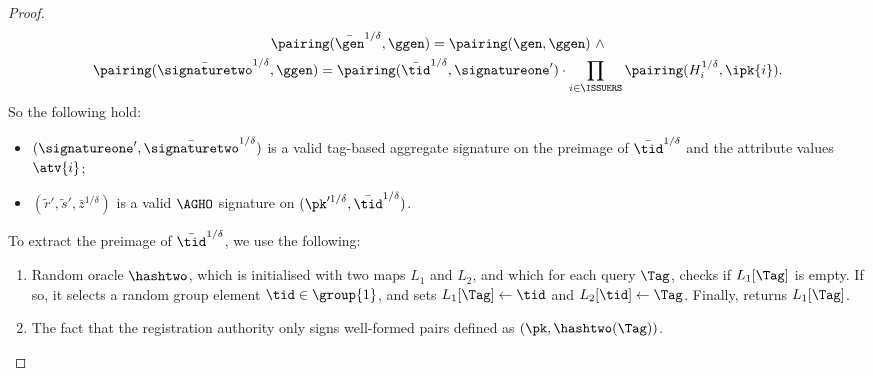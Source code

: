 \begin{proof}
\begin{gather*}
\pairing(\bar{\gen}^{1/\delta}, \ggen)= \pairing(\gen, \ggen) \ \wedge \\
    \pairing(\bar{\signaturetwo}^{1/\delta}, \ggen) =
\pairing(\bar{\tid}^{1/\delta},
\signatureone')\cdot\prod_{i\in\ISSUERS}\pairing(H_i^{1/\delta}, \ipk{i}).
  \end{gather*}
%
  So the following hold:
  \begin{itemize}
    \item $(\signatureone', \bar{\signaturetwo}^{1/\delta})$ is a valid
tag-based aggregate signature on the preimage of $\bar{\tid}^{1/\delta}$ and
the attribute values $\atv{i}$;
    \item $(\widetilde{r}', \widetilde{s}', \bar{z}^{1/\delta})$ is a valid
$\AGHO$ signature on $(\pk'^{1/\delta}, \bar{\tid}^{1/\delta})$.
  \end{itemize}

  To extract the preimage of $\bar{\tid}^{1/\delta}$, we use the following:

  \begin{enumerate}

    \item Random oracle $\hashtwo$, which is initialised with two maps $L_1$ and
$L_2$, and which for each query $\Tag$, checks if $L_1[\Tag]$ is empty. If so,
it  selects a random group element $\tid \in \group{1}$, and sets $L_1[\Tag]
\leftarrow \tid$ and $L_2[\tid] \leftarrow \Tag$.  Finally, returns $L_1[\Tag]$.

    \item The fact that the registration authority only signs well-formed pairs
defined as $(\pk, \hashtwo(\Tag))$.

  \end{enumerate}


\end{proof}
